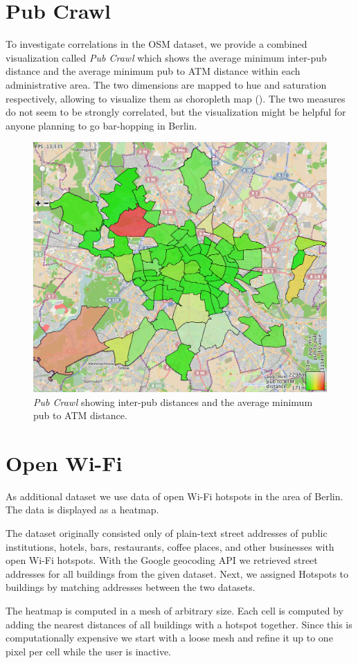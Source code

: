 \section*{Pub Crawl}
To investigate correlations in the OSM dataset, we provide a combined visualization
called \emph{Pub Crawl}
which shows the average minimum inter-pub distance and the average
minimum pub to ATM distance within each administrative area.
The two dimensions are mapped to hue
and saturation respectively, allowing to visualize them as
choropleth map ().
The two measures do not seem to be strongly correlated, but the visualization might
be helpful for anyone planning to go bar-hopping in Berlin.
\begin{figure}[b]
\centering
\includegraphics[width=0.6\linewidth]{imgs/crawl}
\caption{\emph{Pub Crawl} showing inter-pub distances 
and the average minimum pub to ATM distance.}
\label{fig:crawl}
\end{figure}
\section*{Open Wi-Fi}
As additional dataset we use data of open Wi-Fi hotspots in
the area of Berlin.
The data is displayed as a heatmap.

The dataset originally consisted only of plain-text street addresses
of public institutions, hotels, bars, restaurants, coffee places, and
other businesses with open Wi-Fi hotspots.
With the Google geocoding API we retrieved street addresses for all buildings
from the given dataset.
Next, we assigned Hotspots to buildings by matching addresses between the two datasets.

The heatmap is computed in a mesh of
arbitrary size. Each cell is computed by adding
the nearest distances of all buildings with a
hotspot together.
Since this is computationally expensive
we start with a loose mesh and refine it up to one pixel per cell while the
user is inactive.

